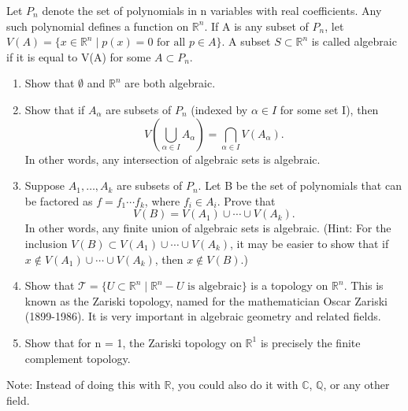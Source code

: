   \begin{exercise}
    Let $P_n$ denote the set of polynomials in n variables with real coefficients. Any such polynomial defines a function on $\mathbb{R}^n$. If A is any subset of $P_n$, let $V(A) = \{x \in \mathbb{R}^n \mid p(x) = 0 \text{ for all } p \in A\}$. A subset $S \subset \mathbb{R}^n$ is called algebraic if it is equal to V(A) for some $A \subset P_n$.

    \begin{enumerate}
      \item Show that $\emptyset$ and $\mathbb{R}^n$ are both algebraic.

      \item Show that if $A_\alpha$ are subsets of $P_n$ (indexed by $\alpha \in I$ for some set I), then
      \begin{equation}
        V\left(\bigcup_{\alpha\in I} A_\alpha\right) = \bigcap_{\alpha\in I} V(A_\alpha).
      \end{equation}
      In other words, any intersection of algebraic sets is algebraic.

      \item Suppose $A_1,\ldots,A_k$ are subsets of $P_n$. Let B be the set of polynomials that can be factored as $f = f_1 \cdots f_k$, where $f_i \in A_i$. Prove that
      \begin{equation}
        V(B) = V(A_1) \cup \cdots \cup V(A_k).
      \end{equation}
      In other words, any finite union of algebraic sets is algebraic. (Hint: For the inclusion $V(B) \subset V(A_1) \cup \cdots \cup V(A_k)$, it may be easier to show that if $x \not\in V(A_1) \cup \cdots \cup V(A_k)$, then $x \not\in V(B)$.)

      \item Show that $\mathcal{T} = \{U \subset \mathbb{R}^n \mid \mathbb{R}^n - U \text{ is algebraic}\}$ is a topology on $\mathbb{R}^n$. This is known as the Zariski topology, named for the mathematician Oscar Zariski (1899-1986). It is very important in algebraic geometry and related fields.

      \item Show that for n = 1, the Zariski topology on $\mathbb{R}^1$ is precisely the finite complement topology.
    \end{enumerate}

    Note: Instead of doing this with $\mathbb{R}$, you could also do it with $\mathbb{C}$, $\mathbb{Q}$, or any other field.
  \end{exercise}
